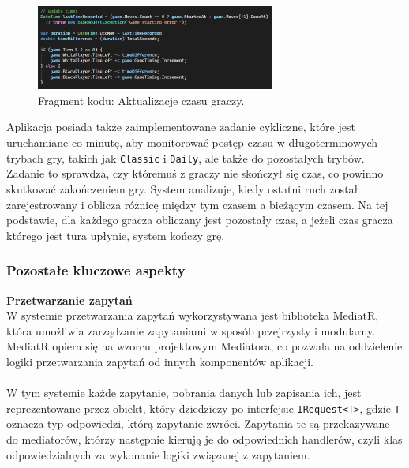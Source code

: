 \documentclass[12pt,a4paper]{article}
\begin{document}
\vspace{0.5cm}
\begin{figure}[h!]
    \centering
    \includegraphics[width=0.7\textwidth]{images/ex_update_times.png}
    \caption{Fragment kodu: Aktualizacje czasu graczy.}
\end{figure}
\vspace{0.5cm}

\noindent
Aplikacja posiada także zaimplementowane zadanie cykliczne, które jest uruchamiane co minutę, aby monitorować postęp czasu w długoterminowych trybach gry, takich jak \texttt{Classic} i \texttt{Daily}, ale także do pozostałych trybów. Zadanie to sprawdza, czy któremuś z graczy nie skończył się czas, co powinno skutkować zakończeniem gry. System analizuje, kiedy ostatni ruch został zarejestrowany i oblicza różnicę między tym czasem a bieżącym czasem. Na tej podstawie, dla każdego gracza obliczany jest pozostały czas, a jeżeli czas gracza którego jest tura upłynie, system kończy grę.

\newpage

\subsubsection{Pozostałe kluczowe aspekty}

\noindent \textbf{Przetwarzanie zapytań}\\
W systemie przetwarzania zapytań wykorzystywana jest biblioteka MediatR, która umożliwia zarządzanie zapytaniami w sposób przejrzysty i modularny. MediatR opiera się na wzorcu projektowym Mediatora, co pozwala na oddzielenie logiki przetwarzania zapytań od innych komponentów aplikacji.
\\\\
W tym systemie każde zapytanie, pobrania danych lub zapisania ich, jest reprezentowane przez obiekt, który dziedziczy po interfejsie \texttt{IRequest<T>}, gdzie \texttt{T} oznacza typ odpowiedzi, którą zapytanie zwróci. Zapytania te są przekazywane do mediatorów, którzy następnie kierują je do odpowiednich handlerów, czyli klas odpowiedzialnych za wykonanie logiki związanej z zapytaniem.
\\\\
\end{document}
